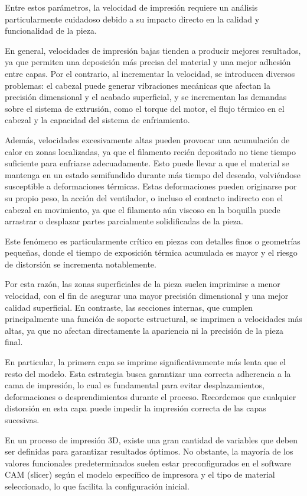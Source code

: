 Entre estos parámetros, la velocidad de impresión requiere un análisis particularmente cuidadoso debido a su impacto directo en la calidad y funcionalidad de la pieza.

En general, velocidades de impresión bajas tienden a producir mejores resultados, ya que permiten una deposición más precisa del material y una mejor adhesión entre capas. Por el contrario, al incrementar la velocidad, se introducen diversos problemas: el cabezal puede generar vibraciones mecánicas que afectan la precisión dimensional y el acabado superficial, y se incrementan las demandas sobre el sistema de extrusión, como el torque del motor, el flujo térmico en el cabezal y la capacidad del sistema de enfriamiento.

Además, velocidades excesivamente altas pueden provocar una acumulación de calor en zonas localizadas, ya que el filamento recién depositado no tiene tiempo suficiente para enfriarse adecuadamente. Esto puede llevar a que el material se mantenga en un estado semifundido durante más tiempo del deseado, volviéndose susceptible a deformaciones térmicas. Estas deformaciones pueden originarse por su propio peso, la acción del ventilador, o incluso el contacto indirecto con el cabezal en movimiento, ya que el filamento aún viscoso en la boquilla puede arrastrar o desplazar partes parcialmente solidificadas de la pieza.

Este fenómeno es particularmente crítico en piezas con detalles finos o geometrías pequeñas, donde el tiempo de exposición térmica acumulada es mayor y el riesgo de distorsión se incrementa notablemente.

Por esta razón, las zonas superficiales de la pieza suelen imprimirse a menor velocidad, con el fin de asegurar una mayor precisión dimensional y una mejor calidad superficial. En contraste, las secciones internas, que cumplen principalmente una función de soporte estructural, se imprimen a velocidades más altas, ya que no afectan directamente la apariencia ni la precisión de la pieza final.

En particular, la primera capa se imprime significativamente más lenta que el resto del modelo. Esta estrategia busca garantizar una correcta adherencia a la cama de impresión, lo cual es fundamental para evitar desplazamientos, deformaciones o desprendimientos durante el proceso. Recordemos que cualquier distorsión en esta capa puede impedir la impresión correcta de las capas sucesivas.

En un proceso de impresión 3D, existe una gran cantidad de variables que deben ser definidas para garantizar resultados óptimos. No obstante, la mayoría de los valores funcionales predeterminados suelen estar preconfigurados en el software CAM (slicer) según el modelo específico de impresora y el tipo de material seleccionado, lo que facilita la configuración inicial.

